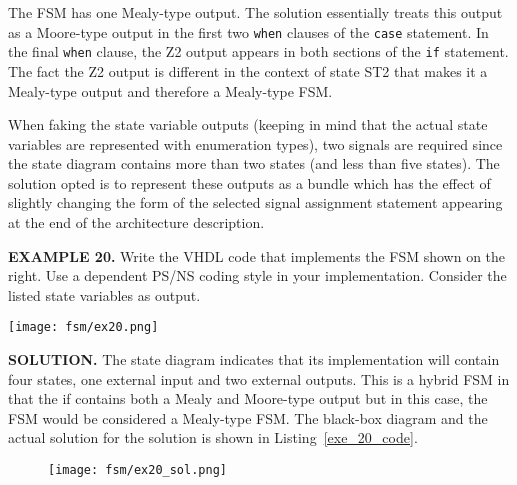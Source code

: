 \begin{my_list}
\item The FSM has one Mealy-type output. The solution essentially treats this output as a Moore-type output in the first two \texttt{when} clauses of the \texttt{case} statement. In the final \texttt{when} clause, the Z2 output appears in both sections of the \texttt{if} statement. The fact the Z2 output is different in the context of state ST2 that makes it a Mealy-type output and therefore a Mealy-type FSM. 

\item When faking the state variable outputs (keeping in mind that the actual state variables are represented with enumeration types), two signals are required since the state diagram contains more than two states (and less than five states). The solution opted is to represent these outputs as a bundle which has the effect of slightly changing the form of the selected signal assignment statement appearing at the end of the architecture description. 
\end{my_list}

\begin{leftbar}
\begin{minipage}[t]{0.5\textwidth}
\vspace{10pt}
\noindent
\textbf{EXAMPLE 20.}
Write the VHDL code that implements the FSM shown on the right. Use a dependent PS/NS coding style in your implementation. Consider the listed state variables as output.
\end{minipage}
\begin{minipage}[t]{0.47\textwidth}
\vspace{0pt}\raggedright
\centering
\texttt{[image: fsm/ex20.png]}
\end{minipage}
\end{leftbar}

\noindent
\textbf{SOLUTION.} The state diagram indicates that its implementation will contain four states, one external input and two external outputs. This is a hybrid FSM in that the if contains both a Mealy and Moore-type output but in this case, the FSM would be considered a Mealy-type FSM. The black-box diagram and the actual solution for the solution is shown in Listing~\ref{exe_20_code}. 
\begin{figure}[!h]
    \centering
	\texttt{[image: fsm/ex20\_sol.png]}
\end{figure}

